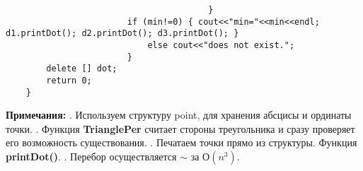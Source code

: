 \documentclass[11pt]{article}
\begin{document}
\begin{flushleft}
\begin{lstlisting}
										} 
						if (min!=0) { cout<<"min="<<min<<endl; d1.printDot(); d2.printDot(); d3.printDot(); }
							else cout<<"does not exist.";
						}
		delete [] dot;
		return 0;
	}
\end{lstlisting}


\textbf{Примечания:}
. Используем структуру point, для хранения абсцисы и ординаты точки.
. Функция \textbf{TrianglePer} считает стороны треугольника и сразу проверяет его возможность существования.
. Печатаем точки прямо из структуры. Функция \textbf{printDot()}.
. Перебор осуществляется $\sim$ за $О(n^3).$
\end{flushleft}


\vfill
{} 
\end{document}
